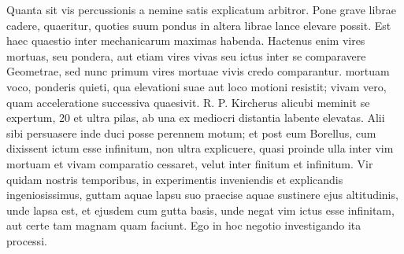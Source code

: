 Quanta sit vis percussionis a nemine satis explicatum arbitror. Pone grave librae cadere, quaeritur, quoties suum pondus in altera librae lance elevare possit. Est haec quaestio inter mechanicarum maximas habenda. Hactenus enim vires mortuas, seu pondera, aut etiam vires vivas seu ictus inter se comparavere Geometrae, sed nunc primum vires mortuae vivis credo comparantur.  mortuam voco, ponderis quieti, qua elevationi suae aut loco motioni resistit; vivam vero, quam acceleratione successiva quaesivit. R. P. Kircherus\protect{} alicubi  meminit se expertum, 20 et ultra pilas, ab una ex mediocri distantia labente elevatas. Alii sibi persuasere inde duci posse perennem motum;  et post eum Borellus\protect{}, cum dixissent ictum esse infinitum, non ultra  explicuere, quasi proinde ulla inter vim mortuam et vivam comparatio cessaret, velut inter finitum et infinitum. Vir quidam nostris temporibus, in experimentis inveniendis et explicandis ingeniosissimus\protect{},  guttam aquae lapsu suo praecise  aquae sustinere ejus altitudinis, unde lapsa est, et ejusdem cum gutta basis, unde negat vim ictus esse infinitam, aut certe tam magnam quam faciunt. Ego in hoc negotio investigando ita processi.\pend
